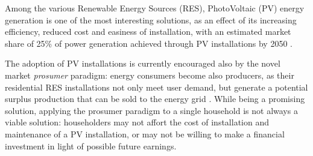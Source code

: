 
Among the various Renewable Energy Sources (RES), PhotoVoltaic (PV) energy generation is one of the most interesting solutions, as an effect of its increasing efficiency, reduced cost and easiness of installation, with an estimated market share of 25\% of power generation achieved through PV installations by 2050 \cite{irena}. %

The adoption of PV installations is currently encouraged also by the novel market \emph{prosumer} paradigm: energy consumers become also producers, as their residential RES installations not only meet user demand, but generate a potential surplus production that can be sold to the energy grid \cite{su11195286}. 
While being a promising solution, applying the prosumer paradigm to a single household is not always a viable solution: householders may not affort the cost of installation and maintenance of a PV installation, or may not be willing to make a financial investment in light of possible future earnings. %

